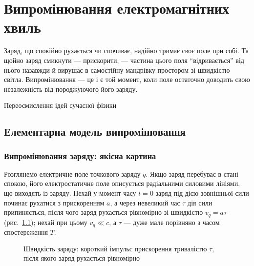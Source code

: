 
\chapter{Випромінювання електромагнітних хвиль}\label{\currfilebase}
\graphicspath{{\currfilebase/Pictures}}
\epigraph{Заряд, що спокійно рухається чи спочиває, надійно тримає своє поле при собі. Та щойно заряд смикнути --- прискорити, --- частина цього
	поля \enquote{відривається} від нього назавжди й вирушає в самостійну мандрівку простором зі швидкістю світла. Випромінювання --- це і є
	той момент, коли поле остаточно доводить свою незалежність від породжуючого його заряду.
}{Переосмислення ідей сучасної фізики}

\section{Елементарна модель випромінювання}

\subsection*{Випромінювання заряду: якісна картина}

Розглянемо електричне поле точкового заряду $q$. Якщо заряд перебуває в стані спокою, його електростатичне поле описується радіальними силовими
лініями, що виходять із заряду. Нехай у момент часу $t=0$ заряд під дією зовнішньої сили починає рухатися з прискоренням $a$, а через невеликий
час $\tau$ дія сили припиняється, після чого заряд рухається рівномірно зі швидкістю $v_q=a\tau$ (рис.~\ref{pic:VelocityGraph}); нехай при цьому
$v_q\ll c$, а $\tau$ --- дуже мале порівняно з часом спостереження $T$.

\begin{figure}[h!]\centering
	\caption{Швидкість заряду: короткий імпульс прискорення тривалістю $\tau$, після якого заряд
		рухається рівномірно\label{pic:VelocityGraph}}
\end{figure}


